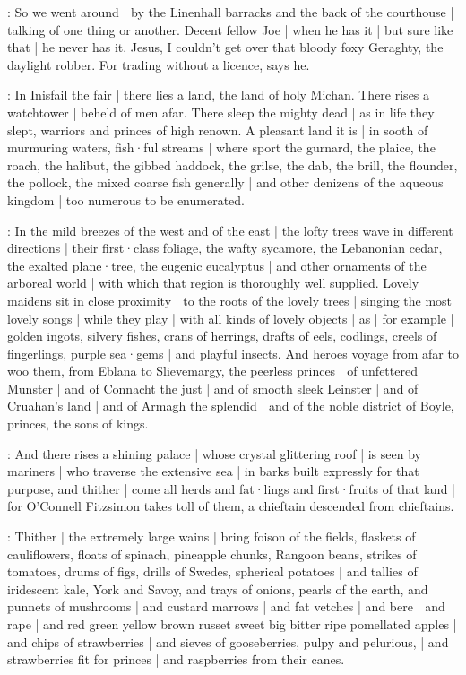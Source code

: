 \Nq:
So we went around |
by the Linenhall barracks and the back of the courthouse |
talking of one thing or another.
Decent fellow Joe |
when he has it |
but sure like that |
he never has it.
Jesus,
I couldn't get over that bloody foxy Geraghty,
the daylight robber.
For trading without a licence,
\sout{says he.}

:
In Inisfail the fair |
there lies a land,
the land of holy Michan.
There rises a watchtower |
beheld of men afar.
There sleep the mighty dead |
as in life they slept,
warriors and princes of high renown.
A pleasant land it is |
in sooth of murmuring waters,
fish·ful streams |
where sport the gurnard,
the plaice,
the roach,
the halibut,
the gibbed haddock,
the grilse,
the dab,
the brill,
the flounder,
the pollock,
the mixed coarse fish generally |
and other denizens of the aqueous kingdom |
too numerous to be enumerated.

:
In the mild breezes of the west and of the east |
the lofty trees wave in different directions |
their first·class foliage,
the wafty sycamore,
the Lebanonian cedar,
the exalted plane·tree,
the eugenic eucalyptus |
and other ornaments of the arboreal world |
with which that region is thoroughly well supplied.
Lovely maidens sit in close proximity |
to the roots of the lovely trees |
singing the most lovely songs
 |
while they play |
with all kinds of lovely objects |
as |
for example |
golden ingots,
silvery fishes,
crans of herrings,
drafts of eels,
codlings,
creels of fingerlings,
purple sea·gems |
and playful insects.
And heroes voyage from afar to woo them,
from Eblana to Slievemargy,
the peerless princes |
of unfettered Munster |
and of Connacht the just |
and of smooth sleek Leinster |
and of Cruahan's land |
and of Armagh the splendid |
and of the noble district of Boyle,
princes,
the sons of kings.

:
And there rises a shining palace |
whose crystal glittering roof |
is seen by mariners |
who traverse the extensive sea |
in barks built expressly for that purpose,
and thither |
come all herds
and fat·lings
and first·fruits
of that land |
for O'Connell Fitzsimon takes toll of them,
a chieftain descended from chieftains.

:
Thither |
the extremely large wains |
bring foison of the fields,
flaskets of cauliflowers,
floats of spinach,
pineapple chunks,
Rangoon beans,
strikes of tomatoes,
drums of figs,
drills of Swedes,
spherical potatoes |
and tallies of iridescent kale,
York and Savoy,
and trays of onions,
pearls of the earth,
and punnets of mushrooms |
and custard marrows |
and fat vetches |
and bere |
and rape |
and red green yellow brown russet sweet big bitter ripe pomellated apples |
and chips of strawberries |
and sieves of gooseberries,
pulpy and pelurious, |
and strawberries fit for princes |
and raspberries from their canes.

